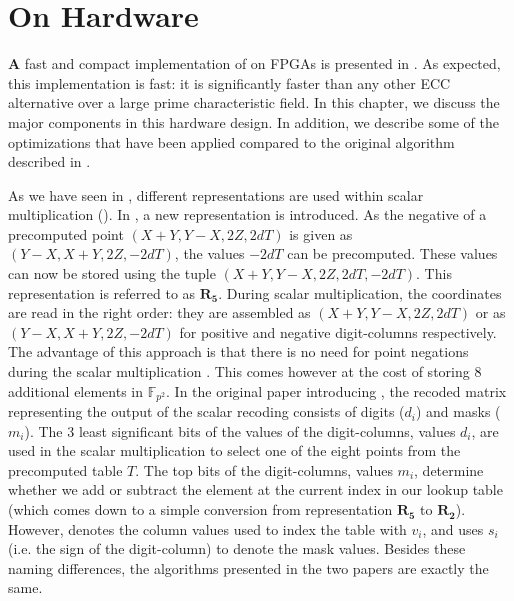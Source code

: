 \chapter{\texorpdfstring{{\fourq} On Hardware}{FourQ On Hardware}} \label{chp: FourQ On Hardware}
\lettrine[lhang = 0.4, findent=-30pt, lines=4]{\textbf{
		\initfamily \fontsize{20mm}{20mm} \selectfont A
		\normalfont}}{} 
fast and compact implementation of {\fourq} on FPGAs is presented in \cite{jarvinen2016four}.
As expected, this implementation is fast: it is significantly faster than any other ECC alternative over a large prime characteristic field.
In this chapter, we discuss the major components in this hardware design.
In addition, we describe some of the optimizations that have been applied compared to the original algorithm described in \cite{costello2015fourq}.

\vspace{5mm} \noindent
%
As we have seen in , different representations are used within {\fourqs} scalar multiplication ().
In \cite{jarvinen2016four}, a new representation is introduced.
As the negative of a precomputed point $(X + Y, Y - X, 2Z, 2dT)$ is given as $(Y - X, X + Y, 2Z, -2dT)$, the values $-2dT$ can be precomputed.
These values can now be stored using the tuple $(X + Y, Y - X, 2Z, 2dT, -2dT)$.
This representation is referred to as $\bm{R_5}$.
During scalar multiplication, the coordinates are read in the right order: they are assembled as  $(X + Y, Y - X, 2Z, 2dT)$ or as $(Y - X, X + Y, 2Z, -2dT)$ for positive and negative digit-columns respectively.
The advantage of this approach is that there is no need for point negations during the scalar multiplication \cite{jarvinen2016four}.
This comes however at the cost of storing 8 additional elements in $\mathbb{F}_{p^2}$.
In the original paper introducing {\fourq}, the recoded matrix representing the output of the scalar recoding consists of digits ($d_i$) and masks ($m_i$).
The 3 least significant bits of the values of the digit-columns, values $d_i$, are used in the scalar multiplication to select one of the eight points from the precomputed table $T$. 
The top bits of the digit-columns, values $m_i$, determine whether we add or subtract the element at the current index in our lookup table (which comes down to a simple conversion from representation $\bm{R_5}$ to $\bm{R_2}$).
However, \cite{jarvinen2016four} denotes the column values used to index the table with $v_i$, and uses $s_i$ (i.e. the sign of the digit-column) to denote the mask values.
Besides these naming differences, the algorithms presented in the two papers are exactly the same.


